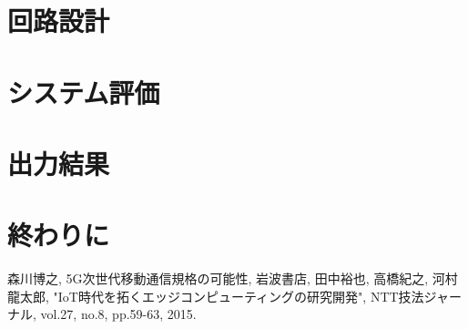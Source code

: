 \documentclass[technicalreport]{ieicej}
\begin{document}
\section{回路設計}

\section{システム評価}

\section{出力結果}

\section{終わりに}

%
%
\begin{thebibliography}{99}%
森川博之, 5G次世代移動通信規格の可能性, 岩波書店, 
田中裕也, 高橋紀之, 河村龍太郎, "IoT時代を拓くエッジコンピューティングの研究開発", NTT技法ジャーナル, vol.27, no.8, pp.59-63, 2015.
\end{thebibliography}
\end{document}
